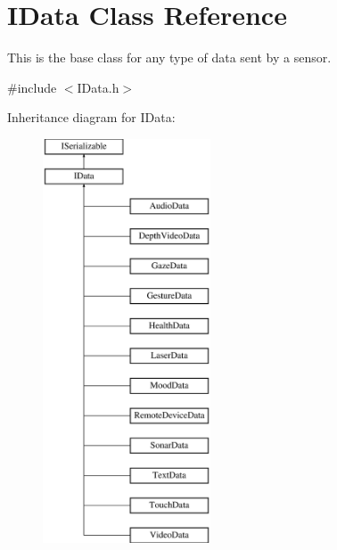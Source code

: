 \hypertarget{class_i_data}{}\section{I\+Data Class Reference}
\label{class_i_data}


This is the base class for any type of data sent by a sensor.  




{\ttfamily \#include $<$I\+Data.\+h$>$}

Inheritance diagram for I\+Data\+:\begin{figure}[H]
\begin{center}
\leavevmode
\includegraphics[height=12.000000cm]{class_i_data}
\end{center}
\end{figure}
